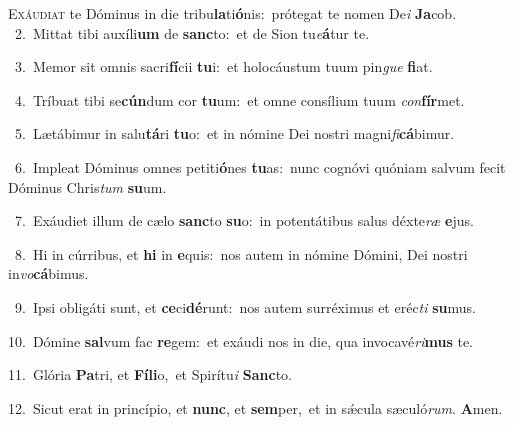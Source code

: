 \lettrine{\initial\textcolor{\initialcolor}{E}}{xáudiat} te Dóminus in die tribu\-\textbf{la}\-ti\-\textbf{ó}\-nis:~\star prótegat te nomen De\textit{i} \textbf{Ja}\-cob.\\
{\numbfont\textcolor{\numbcolor}{~2.}}~Mittat tibi auxíli\textbf{um} de \textbf{sanc}\-to:~\star et de Sion tu\-\textit{e}\-\textbf{á}tur te.\par
{\numbfont\textcolor{\numbcolor}{~3.}}~Memor sit omnis sacri\-\textbf{fí}\-cii \textbf{tu}\-i:~\star et holocáustum tuum pin\textit{gue} \textbf{fi}\-at.\par
{\numbfont\textcolor{\numbcolor}{~4.}}~Tríbuat tibi se\-\textbf{cún}\-dum cor \textbf{tu}\-um:~\star et omne consílium tuum \textit{con}\-\textbf{fír}met.\par
{\numbfont\textcolor{\numbcolor}{~5.}}~Lætábimur in salu\-\textbf{tá}\-ri \textbf{tu}\-o:~\star et in nómine Dei nostri magni\-\textit{fi}\-\textbf{cá}bimur.\par
{\numbfont\textcolor{\numbcolor}{~6.}}~Impleat Dóminus omnes petiti\-\textbf{ó}\-nes \textbf{tu}\-as:~\star nunc cognóvi quóniam salvum fecit Dóminus Chris\textit{tum} \textbf{su}\-um.\par
{\numbfont\textcolor{\numbcolor}{~7.}}~Exáudiet illum de cælo \textbf{sanc}\-to \textbf{su}\-o:~\star in potentátibus salus déxte\textit{ræ} \textbf{e}\-jus.\par
{\numbfont\textcolor{\numbcolor}{~8.}}~Hi in cúrribus, et \textbf{hi} in \textbf{e}\-quis:~\star nos autem in nómine Dómini, Dei nostri in\-\textit{vo}\-\textbf{cá}bimus.\par
{\numbfont\textcolor{\numbcolor}{~9.}}~Ipsi obligáti sunt, et \textbf{ce}\-ci\-\textbf{dé}\-runt:~\star nos autem surréximus et eréc\textit{ti} \textbf{su}\-mus.\par
{\numbfont\textcolor{\numbcolor}{10.}}~Dómine \textbf{sal}\-vum fac \textbf{re}\-gem:~\star et exáudi nos in die, qua invocavé\-\textit{ri}\-\textbf{mus} te.\par
{\numbfont\textcolor{\numbcolor}{11.}}~Glória \textbf{Pa}\-tri, et \textbf{Fí}\-\textbf{li}o,~\star et Spirítu\textit{i} \textbf{Sanc}\-to.\par
{\numbfont\textcolor{\numbcolor}{12.}}~Sicut erat in princípio, et \textbf{nunc}\-, et \textbf{sem}\-per,~\star et in sǽcula sæculó\-\textit{rum}\-. \textbf{A}\-men.\par
